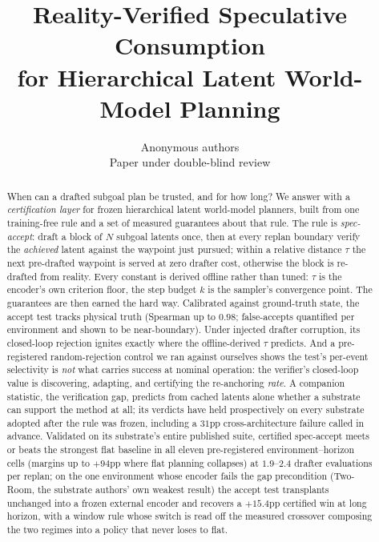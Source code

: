 \documentclass{article}
\title{Reality-Verified Speculative Consumption\\
for Hierarchical Latent World-Model Planning}
\author{Anonymous authors \\ Paper under double-blind review}
\begin{document}
\maketitle

\begin{abstract}
When can a drafted subgoal plan be trusted, and for how long? We answer with a
\emph{certification layer} for frozen hierarchical latent world-model planners,
built from one training-free rule and a set of measured guarantees about that rule.
The rule is \emph{spec-accept}: draft a block of $N$ subgoal latents once, then at
every replan boundary verify the \emph{achieved} latent against the waypoint just
pursued; within a relative distance $\tau$ the next pre-drafted waypoint is served
at zero drafter cost, otherwise the block is re-drafted from reality. Every
constant is derived offline rather than tuned: $\tau$ is the encoder's own
criterion floor, the step budget $k$ is the sampler's convergence point. The
guarantees are then earned the hard way. Calibrated against ground-truth state,
the accept test tracks physical truth (Spearman up to $0.98$; false-accepts
quantified per environment and shown to be near-boundary). Under injected drafter
corruption, its closed-loop rejection ignites exactly where the offline-derived
$\tau$ predicts. And a pre-registered random-rejection control we ran against
ourselves shows the test's per-event selectivity is \emph{not} what carries
success at nominal operation: the verifier's closed-loop value is discovering,
adapting, and certifying the re-anchoring \emph{rate}. A companion statistic, the
verification gap, predicts from cached latents alone whether a substrate can
support the method at all; its verdicts have held prospectively on every
substrate adopted after the rule was frozen, including a $31$pp cross-architecture
failure called in advance. Validated on its substrate's entire published suite,
certified spec-accept meets or beats the strongest flat baseline in all eleven
pre-registered environment--horizon cells (margins up to $+94$pp where flat
planning collapses) at $1.9$--$2.4$ drafter evaluations per replan; on the one
environment whose encoder fails the gap precondition (Two-Room, the substrate
authors' own weakest result) the accept test transplants unchanged into a frozen
external encoder and recovers a $+15.4$pp certified win at long horizon, with a
window rule whose switch is read off the measured crossover composing the two
regimes into a policy that never loses to flat.
\end{abstract}
\end{document}
